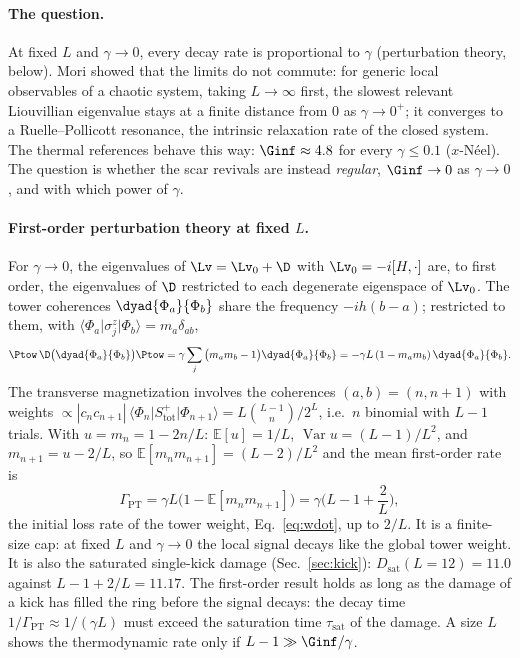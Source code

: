 \paragraph{The question.} At fixed $L$ and $\gamma \to 0$, every decay rate is proportional to $\gamma$ (perturbation theory, below). Mori showed that the limits do not commute: for generic local observables of a chaotic system, taking $L \to \infty$ first, the slowest relevant Liouvillian eigenvalue stays at a finite distance from $0$ as $\gamma \to 0^+$; it converges to a Ruelle--Pollicott resonance, the intrinsic relaxation rate of the closed system. The thermal references behave this way: $\Ginf \approx 4.8$ for every $\gamma \le 0.1$ ($x$-N\'eel). The question is whether the scar revivals are instead \emph{regular}, $\Ginf \to 0$ as $\gamma \to 0$, and with which power of $\gamma$.

\paragraph{First-order perturbation theory at fixed $L$.} For $\gamma \to 0$, the eigenvalues of $\Lv = \Lv_0 + \D$ with $\Lv_0 = -i[H,\cdot]$ are, to first order, the eigenvalues of $\D$ restricted to each degenerate eigenspace of $\Lv_0$. The tower coherences $\dyad{\Phi_a}{\Phi_b}$ share the frequency $-ih(b - a)$; restricted to them, with $\langle\Phi_a\vert\sigma^z_j\vert\Phi_b\rangle = m_a\delta_{ab}$,
\[ \Ptow\,\D\big(\dyad{\Phi_a}{\Phi_b}\big)\Ptow = \gamma\sum_j\big(m_am_b - 1\big)\dyad{\Phi_a}{\Phi_b} = -\gamma L\,(1 - m_am_b)\,\dyad{\Phi_a}{\Phi_b}. \]
The transverse magnetization involves the coherences $(a, b) = (n, n+1)$ with weights $\propto |c_nc_{n+1}|\,\langle\Phi_n\vert S^+_{\mathrm{tot}}\vert\Phi_{n+1}\rangle = L\binom{L-1}{n}/2^L$, i.e.\ $n$ binomial with $L - 1$ trials. With $u = m_n = 1 - 2n/L$: $\mathbb E[u] = 1/L$, $\operatorname{Var}u = (L-1)/L^2$, and $m_{n+1} = u - 2/L$, so $\mathbb E[m_nm_{n+1}] = (L-2)/L^2$ and the mean first-order rate is
\begin{equation}
\Gamma_{\mathrm{PT}} = \gamma L\big(1 - \mathbb E[m_nm_{n+1}]\big) = \gamma\Big(L - 1 + \frac2L\Big),
\label{eq:cap}
\end{equation}
the initial loss rate of the tower weight, Eq.~\eqref{eq:wdot}, up to $2/L$. It is a finite-size cap: at fixed $L$ and $\gamma \to 0$ the local signal decays like the global tower weight. It is also the saturated single-kick damage (Sec.~\ref{sec:kick}): $D_{\mathrm{sat}}(L = 12) = 11.0$ against $L - 1 + 2/L = 11.17$. The first-order result holds as long as the damage of a kick has filled the ring before the signal decays: the decay time $1/\Gamma_{\mathrm{PT}} \approx 1/(\gamma L)$ must exceed the saturation time $\tau_{\mathrm{sat}}$ of the damage. A size $L$ shows the thermodynamic rate only if $L - 1 \gg \Ginf/\gamma$.

